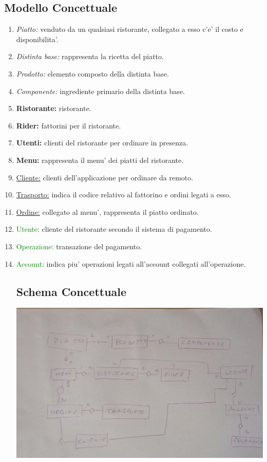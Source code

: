 \documentclass[a4paper, 12pt]{article}
\begin{document}
\subsection{Modello Concettuale}
\begin{enumerate}
    \item \textit{Piatto:} venduto da un qualsiasi ristorante, collegato a esso c'e' il costo e disponibilita'.
    \item \textit{Distinta base:} rappresenta la ricetta del piatto.
    \item \textit{Prodotto:} elemento composto della distinta base.
    \item \textit{Componente:} ingrediente primario della distinta base.
    \\
    \item \textbf{Ristorante:} ristorante.
    \item \textbf{Rider:} fattorini per il ristorante.
    \item \textbf{Utenti:} clienti del ristorante per ordinare in presenza.
    \item \textbf{Menu:} rappresenta il menu' dei piatti del ristorante.
    \\
    \item \underline{Cliente:} clienti dell'applicazione per ordinare da remoto.
    \item \underline{Trasporto:} indica il codice relativo al fattorino e ordini legati a esso.
    \item \underline{Ordine:} collegato al menu', rappresenta il piatto ordinato.
    \\
    \item \textcolor{green}{Utente}: cliente del ristorante secondo il sistema di pagamento.
    \item \textcolor{green}{Operazione:} transazione del pagamento.
    \item \textcolor{green}{Account}: indica piu' operazioni legati all'account collegati all'operazione.
    
    \subsection{Schema Concettuale}
    \includegraphics[width=15cm]{photo_2021-02-02_21-29-01.jpg}
    
\end{enumerate}
\end{document}
